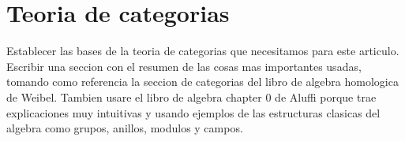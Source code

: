 \section{Teoria de categorias}
\label{sec:teoria-de-categorias}
Establecer las bases de la teoria de categorias que necesitamos para este articulo.
Escribir una seccion con el resumen de las cosas mas importantes usadas, tomando
como referencia la seccion de categorias del libro de algebra homologica de Weibel.
Tambien usare el libro de algebra chapter 0 de Aluffi porque trae explicaciones
muy intuitivas y usando ejemplos de las estructuras clasicas del algebra como
grupos, anillos, modulos y campos.
